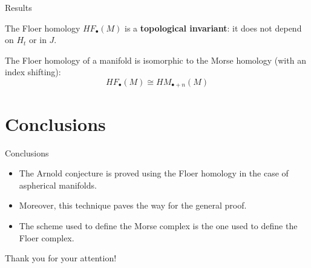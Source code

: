 \documentclass{beamer}
\newcommand{\con}[1]{\mathbb{#1}}
\newcommand{\R}{\con{R}}
\begin{document}

%

\begin{frame}{Results}
	\begin{theorem}
		The Floer homology $HF_{\bullet}(M)$ is a {\bf topological invariant}: it does not depend on $H_t$ or in $J$.
	\end{theorem}

	\begin{theorem}
		The Floer homology of a manifold is isomorphic to the Morse homology (with an index shifting):
		\[HF_{\bullet}(M) \cong HM_{\bullet+n}(M)\]
	\end{theorem}
\end{frame}

\section{Conclusions}

\begin{frame}{Conclusions}
	\begin{itemize}
		\item The Arnold conjecture is proved using the Floer homology in the case of aspherical manifolds.
		\item Moreover, this technique paves the way for the general proof.
		\item The scheme used to define the Morse complex is the one used to define the Floer complex.
	\end{itemize}
\end{frame}

\begin{frame}
	\begin{center}
		\huge Thank you for your attention!
	\end{center}
\end{frame}
\end{document}

